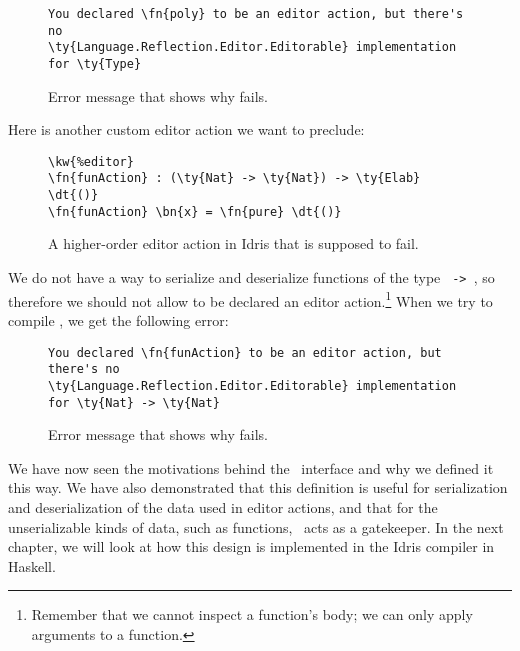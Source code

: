 
\begin{figure}[H]
  \caption{Error message that shows why  fails.}
\begin{Verbatim}[framesep=2mm, label=\footnotesize{\normalfont{Idris error message}}, labelposition=topline]
You declared \fn{poly} to be an editor action, but there's no
\ty{Language.Reflection.Editor.Editorable} implementation for \ty{Type}
\end{Verbatim}
\end{figure}

Here is another custom editor action we want to preclude:

\begin{figure}[H]
  \caption{A higher-order editor action  in Idris that is supposed to fail.}
\begin{Verbatim}[framesep=2mm, label=\footnotesize{\normalfont{Idris}}, labelposition=topline]
\kw{%editor}
\fn{funAction} : (\ty{Nat} -> \ty{Nat}) -> \ty{Elab} \dt{()}
\fn{funAction} \bn{x} = \fn{pure} \dt{()}
\end{Verbatim}
\end{figure}

We do not have a way to serialize and deserialize functions of the type
\texttt{ -> }, so therefore we should not allow 
to be declared an editor action.\footnote{Remember that we cannot inspect a
function's body; we can only apply arguments to a function.}
When we try to compile , we get the following error:

\begin{figure}[H]
  \caption{Error message that shows why  fails.}
\begin{Verbatim}[framesep=2mm, label=\footnotesize{\normalfont{Idris error message}}, labelposition=topline]
You declared \fn{funAction} to be an editor action, but there's no
\ty{Language.Reflection.Editor.Editorable} implementation for \ty{Nat} -> \ty{Nat}
\end{Verbatim}
\end{figure}

We have now seen the motivations behind the \Editorable\ interface and
why we defined it this way. We have also demonstrated that this definition
is useful for serialization and deserialization of the data used in editor
actions, and that for the unserializable kinds of data, such as functions,
\Editorable\ acts as a gatekeeper. In the next chapter, we will look at how
this design is implemented in the Idris compiler in Haskell.

